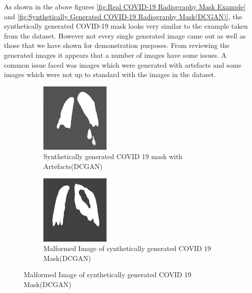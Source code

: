 As shown in the above figures \ref{fig:Real COVID-19 Radiography Mask Example} and \ref{fig:Synthetically Generated COVID-19 Radiography Mask(DCGAN)}, the synthetically generated COVID-19 mask looks very similar to the example taken from the dataset.  However not every single generated image came out as well as those that we have shown for demonstration purposes.  From reviewing the generated images it appears that a number of images have some issues.  A common issue faced was images which were generated with artefacts and some images which were not up to standard with the images in the dataset.   
 \begin{figure}[H]
    \centering
    \begin{subfigure}{.4\textwidth}
    \centering
      \includegraphics[width=.4\linewidth,keepaspectratio]{Images/ArtefactImageCOVID19MaskRadiographyDCGAN.png}
      \caption{Synthetically generated COVID 19 mask with Artefacts(DCGAN)}
      \label{fig:Image with Artefacts(Radiography DCGAN)}
    \end{subfigure}\hfill%
    \begin{subfigure}{.4\textwidth}
    \centering
      \includegraphics[width=.4\linewidth,keepaspectratio]{Images/MalformedImageCOVID19MaskRadiographyDCGAN.png}
      \caption{Malformed Image of synthetically generated COVID 19 Mask(DCGAN)}
      \label{fig:Malformed Image of COVID 19 Mask(Radiography DCGAN)}
    \end{subfigure}\hfill%
\end{figure}
